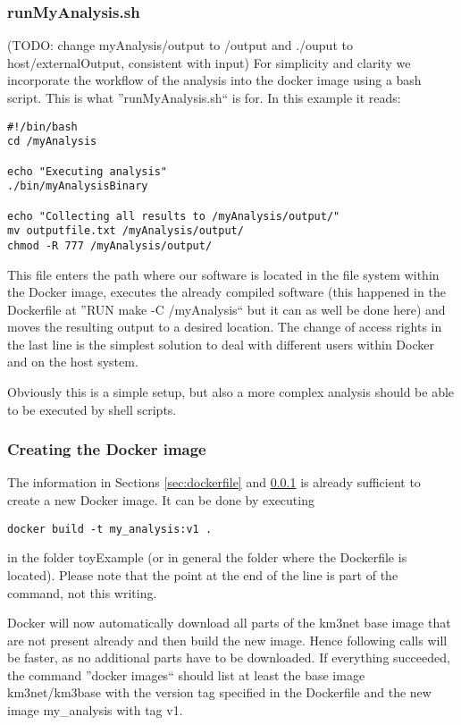 \documentclass[a4paper, twoside, 11pt]{article}
\begin{document}
\subsubsection{runMyAnalysis.sh}
\label{sec:runmyanalysis}
(TODO: change myAnalysis/output to /output and ./ouput to host/externalOutput, consistent with input)
For simplicity and clarity we incorporate the workflow of the analysis into the docker image using a bash script. 
This is what ''runMyAnalysis.sh`` is for. In this example it reads:
\begin{lstlisting}[basicstyle=\footnotesize\ttfamily,frame=single]
#!/bin/bash
cd /myAnalysis

echo "Executing analysis"
./bin/myAnalysisBinary

echo "Collecting all results to /myAnalysis/output/"
mv outputfile.txt /myAnalysis/output/
chmod -R 777 /myAnalysis/output/
\end{lstlisting}
This file enters the path where our software is located in 
the file system within the Docker image, 
executes the already compiled software 
(this happened in the Dockerfile at ''RUN make -C /myAnalysis`` but it can as well be done here) 
and moves the resulting output to a desired location.
The change of access rights in the last line is the simplest solution 
to deal with different users within Docker and on the host system. 

Obviously this is a simple setup, but also a more complex analysis should be able to be executed by shell scripts. 

\subsubsection{Creating the Docker image}
\label{sec:createImage}
The information in Sections \ref{sec:dockerfile} and \ref{sec:runmyanalysis} 
is already sufficient to create a new Docker image. 
It can be done by executing
\begin{lstlisting}[basicstyle=\footnotesize\ttfamily,frame=single]
docker build -t my_analysis:v1 .
\end{lstlisting}
in the folder toyExample (or in general the folder where the Dockerfile is located). 
Please note that the point at the end of the line is part of the command, not this writing. 

Docker will now automatically download all parts of the km3net base image 
that are not present already and then build the new image. 
Hence following calls will be faster, as no additional parts have to be downloaded. 
If everything succeeded, the command ''docker images`` 
should list at least the base image km3net/km3base 
with the version tag specified in the Dockerfile and 
the new image my\_analysis with tag v1. 
\end{document}
